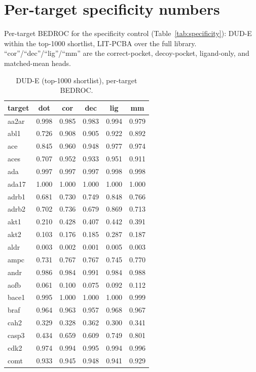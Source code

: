 \documentclass[10pt,letterpaper,twocolumn]{article}
\begin{document}
\section{Per-target specificity numbers}
\label{app:pertarget}
Per-target BEDROC for the specificity control (Table~\ref{tab:specificity}): DUD-E within the top-1000 shortlist, LIT-PCBA over the full library. ``cor''/``dec''/``lig''/``mm'' are the correct-pocket, decoy-pocket, ligand-only, and matched-mean heads.

\begin{table}[h]
\centering
\scriptsize
\setlength{\tabcolsep}{3pt}
\caption{DUD-E (top-1000 shortlist), per-target BEDROC.}
\begin{tabular}{@{}lccccc@{}}
\toprule
target & dot & cor & dec & lig & mm \\
\midrule
aa2ar & 0.998 & 0.985 & 0.983 & 0.994 & 0.979 \\
abl1 & 0.726 & 0.908 & 0.905 & 0.922 & 0.892 \\
ace & 0.845 & 0.960 & 0.948 & 0.977 & 0.974 \\
aces & 0.707 & 0.952 & 0.933 & 0.951 & 0.911 \\
ada & 0.997 & 0.997 & 0.997 & 0.998 & 0.998 \\
ada17 & 1.000 & 1.000 & 1.000 & 1.000 & 1.000 \\
adrb1 & 0.681 & 0.730 & 0.749 & 0.848 & 0.766 \\
adrb2 & 0.702 & 0.736 & 0.679 & 0.869 & 0.713 \\
akt1 & 0.210 & 0.428 & 0.407 & 0.442 & 0.391 \\
akt2 & 0.103 & 0.176 & 0.185 & 0.287 & 0.187 \\
aldr & 0.003 & 0.002 & 0.001 & 0.005 & 0.003 \\
ampc & 0.731 & 0.767 & 0.767 & 0.745 & 0.770 \\
andr & 0.986 & 0.984 & 0.991 & 0.984 & 0.988 \\
aofb & 0.061 & 0.100 & 0.075 & 0.092 & 0.112 \\
bace1 & 0.995 & 1.000 & 1.000 & 1.000 & 0.999 \\
braf & 0.964 & 0.963 & 0.957 & 0.968 & 0.967 \\
cah2 & 0.329 & 0.328 & 0.362 & 0.300 & 0.341 \\
casp3 & 0.434 & 0.659 & 0.609 & 0.749 & 0.801 \\
cdk2 & 0.974 & 0.994 & 0.995 & 0.994 & 0.996 \\
comt & 0.933 & 0.945 & 0.948 & 0.941 & 0.929 \\
\bottomrule
\end{tabular}
\end{table}
\end{document}
